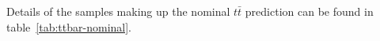 Details of the samples making up the nominal $t\bar{t}$ prediction can be found
in table~\ref{tab:ttbar-nominal}.









